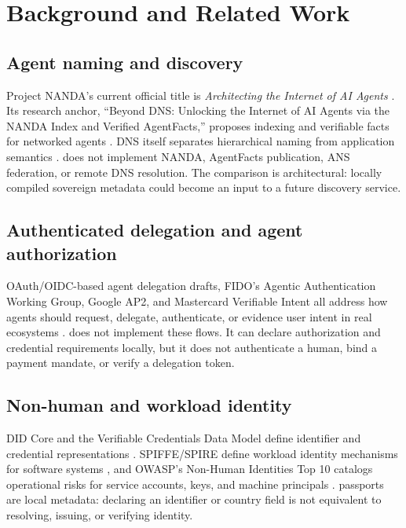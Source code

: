 \section{Background and Related Work}\label{sec:background}

\subsection{Agent naming and discovery}
Project NANDA's current official title is \emph{Architecting the Internet of AI Agents}
\citep{projectnanda2026}.  Its research anchor, ``Beyond DNS: Unlocking the
Internet of AI Agents via the NANDA Index and Verified AgentFacts,'' proposes
indexing and verifiable facts for networked agents
\citep{raskar2025beyonddns}.  DNS itself separates hierarchical naming from
application semantics \citep{mockapetris1987dnsconcepts,mockapetris1987dnsimplementation}.
\Argorix does not implement NANDA, AgentFacts publication, ANS federation, or
remote DNS resolution.  The comparison is architectural: locally compiled
sovereign metadata could become an input to a future discovery service.

\subsection{Authenticated delegation and agent authorization}
OAuth/OIDC-based agent delegation drafts, FIDO's Agentic Authentication Working
Group, Google AP2, and Mastercard Verifiable Intent all address how agents
should request, delegate, authenticate, or evidence user intent in real
ecosystems \citep{oauth_agent_delegation,fido_agentic_awg,google_ap2,mastercard_verifiable_intent}.
\Argorix does not implement these flows.  It can declare authorization and
credential requirements locally, but it does not authenticate a human, bind a
payment mandate, or verify a delegation token.

\subsection{Non-human and workload identity}
DID Core and the Verifiable Credentials Data Model define identifier and
credential representations \citep{w3c_did_core_2022,w3c_vc_data_model_2025}.
SPIFFE/SPIRE define workload identity mechanisms for software systems
\citep{spiffe_overview,spire_overview}, and OWASP's Non-Human Identities Top
10 catalogs operational risks for service accounts, keys, and machine
principals \citep{owasp_nhi_top10}.  \Argorix passports are local metadata:
declaring an identifier or country field is not equivalent to resolving,
issuing, or verifying identity.

